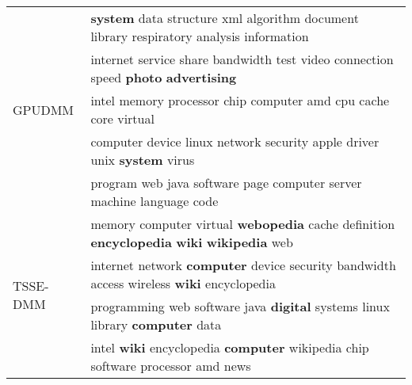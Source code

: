 \begin{table}[ht]
{\begin{tabular}{ll}
\multirow{5}{*}{GPUDMM} & \textbf{system} data structure xml algorithm document library respiratory analysis information \\
    & internet service share bandwidth test video connection speed \textbf{photo} \textbf{advertising} \\
    & intel memory processor chip computer amd cpu cache core virtual \\
    & computer device linux network security apple driver unix \textbf{system} virus \\
    & program web java software page computer server machine language code \\\midrule
\multirow{4}{*}{TSSE-DMM} & memory computer virtual \textbf{webopedia} cache definition \textbf{encyclopedia} \textbf{wiki} \textbf{wikipedia} web \\
    & internet network \textbf{computer} device security bandwidth access wireless \textbf{wiki} encyclopedia \\
    & programming web software java \textbf{digital} systems linux library \textbf{computer} data \\
    & intel \textbf{wiki} encyclopedia \textbf{computer} wikipedia chip software processor amd news \\\midrule

\end{tabular}}
\end{table}
